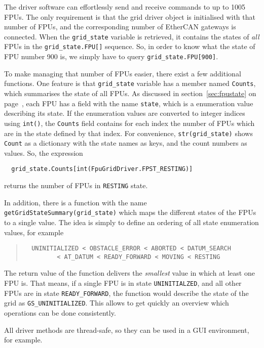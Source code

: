 \documentclass{scrartcl}[12pt,a4paper]
\begin{document}
The driver software can effortlessly send and receive commands to up
to 1005 FPUs. The only requirement is that the grid driver object is
initialised with that number of FPUs, and the corresponding number of
EtherCAN gateways is connected. When the \texttt{grid\_state} variable
is retrieved, it contains the states of \emph{all} FPUs in the
\verb+grid_state.FPU[]+ sequence. So, in order to know what the state
of FPU number 900 is, we simply have to query
\verb+grid_state.FPU[900]+.

To make managing that number of FPUs easier, there exist a few
additional functions. One feature is that \texttt{grid\_state}
variable has a member named \texttt{Counts}, which summarises the
state of all FPUs. As discussed in section~\ref{sec:fpustate} on
page~\pageref{sec:fpustate}, each FPU has a field with the name
\texttt{state}, which is a enumeration value describing its state. If
the enumeration values are converted to integer indices using
\texttt{int()}, the \texttt{Counts} field contains for each index the
number of FPUs which are in the state defined by that index. For
convenience, \texttt{str(grid\_state)} shows \texttt{Count} as a
dictionary with the state names as keys, and the count numbers as
values. So, the expression
\begin{verbatim}
  grid_state.Counts[int(FpuGridDriver.FPST_RESTING)]
\end{verbatim}
returns the number of FPUs in \texttt{RESTING} state.

In addition, there is a function with the name
\texttt{getGridStateSummary(grid\_state)} which maps the different states of the
FPUs to a single value. The idea is simply to define an ordering of
all state enumeration values, for example
\begin{quote}
\begin{verbatim}
  UNINITIALIZED < OBSTACLE_ERROR < ABORTED < DATUM_SEARCH
         < AT_DATUM < READY_FORWARD < MOVING < RESTING
\end{verbatim}
\end{quote}

The return value of the function delivers the \emph{smallest} value in
which at least one FPU is.  That means, if a single FPU is in state
\texttt{UNINITIALZED}, and all other FPUs are in state
\texttt{READY\_FORWARD}, the function would describe the state of the
grid as \texttt{GS\_UNINITIALIZED}. This allows to get quickly an overview
which operations can be done consistently.

All driver methods are thread-safe, so they can be used in a GUI
environment, for example.
\end{document}
